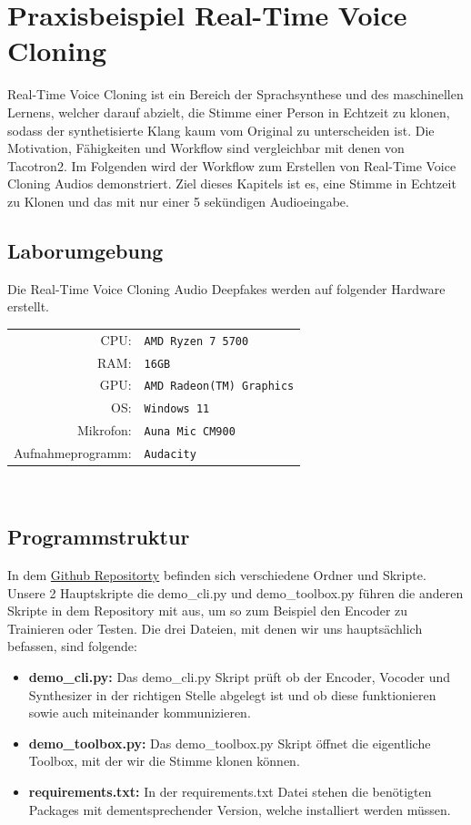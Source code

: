 \section{Praxisbeispiel Real-Time Voice Cloning}
Real-Time Voice Cloning ist ein Bereich der Sprachsynthese und des maschinellen Lernens, welcher darauf abzielt, die Stimme einer Person in Echtzeit zu klonen, sodass der synthetisierte Klang kaum vom Original zu unterscheiden ist.\newline
Die Motivation, Fähigkeiten und Workflow sind vergleichbar mit denen von Tacotron2.\newline
Im Folgenden wird der Workflow zum Erstellen von Real-Time Voice Cloning Audios demonstriert. Ziel dieses Kapitels ist es, eine Stimme in Echtzeit zu Klonen und das mit nur einer 5 sekündigen Audioeingabe.
\subsection{Laborumgebung}
Die Real-Time Voice Cloning Audio Deepfakes werden auf folgender Hardware erstellt.\\[0.5cm]
\begin{tabular}{rl}
    CPU:& \texttt{AMD Ryzen 7 5700}\\
    RAM:& \texttt{16GB}\\
    GPU:& \texttt{AMD Radeon(TM) Graphics}\\
    OS:& \texttt{Windows 11}\\
    Mikrofon:& \texttt{Auna Mic CM900}\\
    Aufnahmeprogramm:& \texttt{Audacity}
\end{tabular}\\[0.5cm]
\subsection{Programmstruktur}
In dem \href{https://github.com/CorentinJ/Real-Time-Voice-Cloning}{Github Repositorty} befinden sich verschiedene Ordner und Skripte. Unsere 2 Hauptskripte die demo\_cli.py und demo\_toolbox.py führen die anderen Skripte in dem Repository mit aus, um so zum Beispiel den Encoder zu Trainieren oder Testen.
Die drei Dateien, mit denen wir uns hauptsächlich befassen, sind folgende:
\begin{itemize}
    \item \textbf{demo\_cli.py:} Das demo\_cli.py Skript prüft ob der Encoder, Vocoder und Synthesizer in der richtigen Stelle abgelegt ist und ob diese funktionieren sowie auch miteinander kommunizieren.
    \item \textbf{demo\_toolbox.py:} Das demo\_toolbox.py Skript öffnet die eigentliche Toolbox, mit der wir die Stimme klonen können.
    \item \textbf{requirements.txt:} In der requirements.txt Datei stehen die benötigten Packages mit dementsprechender Version, welche installiert werden müssen.
\end{itemize}


